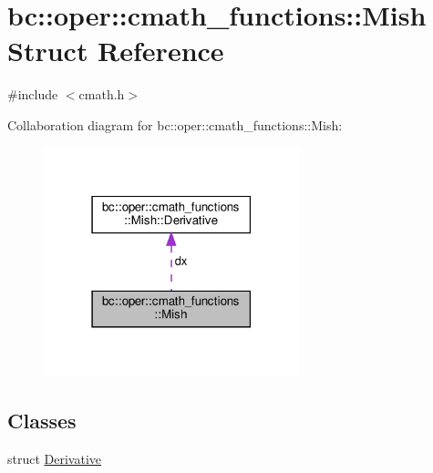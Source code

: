 \hypertarget{structbc_1_1oper_1_1cmath__functions_1_1Mish}{}\section{bc\+:\+:oper\+:\+:cmath\+\_\+functions\+:\+:Mish Struct Reference}
\label{structbc_1_1oper_1_1cmath__functions_1_1Mish}


{\ttfamily \#include $<$cmath.\+h$>$}



Collaboration diagram for bc\+:\+:oper\+:\+:cmath\+\_\+functions\+:\+:Mish\+:\nopagebreak
\begin{figure}[H]
\begin{center}
\leavevmode
\includegraphics[width=210pt]{structbc_1_1oper_1_1cmath__functions_1_1Mish__coll__graph}
\end{center}
\end{figure}
\subsection*{Classes}
\begin{DoxyCompactItemize}
\item 
struct \hyperlink{structbc_1_1oper_1_1cmath__functions_1_1Mish_1_1Derivative}{Derivative}
\end{DoxyCompactItemize}
